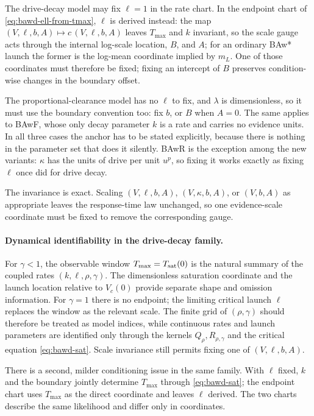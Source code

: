 \documentclass[12pt]{article}
\theoremstyle{remark}
\begin{document}
The drive-decay model may fix $\ell = 1$ in the rate chart. In the endpoint chart of \eqref{eq:bawd-ell-from-tmax}, $\ell$ is derived instead: the map $(V,\ell,b,A)\mapsto c\,(V,\ell,b,A)$ leaves $T_{\max}$ and $k$ invariant, so the scale gauge acts through the internal log-scale location, $B$, and $A$; for an ordinary BAw* launch the former is the log-mean coordinate implied by $m_L$. One of those coordinates must therefore be fixed; fixing an intercept of $B$ preserves condition-wise changes in the boundary offset.

The proportional-clearance model has no $\ell$ to fix, and $\lambda$ is dimensionless, so it must use the boundary convention too: fix $b$, or $B$ when $A = 0$. The same applies to BAwF, whose only decay parameter $k$ is a rate and carries no evidence units. In all three cases the anchor has to be stated explicitly, because there is nothing in the parameter set that does it silently. BAwR is the exception among the new variants: $\kappa$ has the units of drive per unit $u^{p}$, so fixing it works exactly as fixing $\ell$ once did for drive decay.

The invariance is exact. Scaling $(V,\ell,b,A)$, $(V,\kappa,b,A)$, or $(V,b,A)$ as appropriate leaves the response-time law unchanged, so one evidence-scale coordinate must be fixed to remove the corresponding gauge.

\paragraph{Dynamical identifiability in the drive-decay family.} For
$\gamma<1$, the observable window $T_{\max}=T_{\rm sat}(0)$ is the natural summary of the coupled rates $(k,\ell,\rho,\gamma)$. The dimensionless saturation coordinate and the launch location relative to $V_c(0)$ provide separate shape and omission information. For $\gamma=1$ there is no endpoint; the limiting critical launch $\ell$ replaces the window as the relevant scale. The finite grid of $(\rho,\gamma)$ should therefore be treated as model indices, while continuous rates and launch parameters are identified only through the kernels $Q_\rho,R_{\rho,\gamma}$ and the critical equation
\eqref{eq:bawd-sat}. Scale invariance still permits fixing one of
$(V,\ell,b,A)$.

There is a second, milder conditioning issue in the same family. With $\ell$ fixed, $k$ and the boundary jointly determine $T_{\max}$ through
\eqref{eq:bawd-sat}; the endpoint chart uses $T_{\max}$ as the direct
coordinate and leaves $\ell$ derived. The two charts describe the same likelihood and differ only in coordinates.
\end{document}
